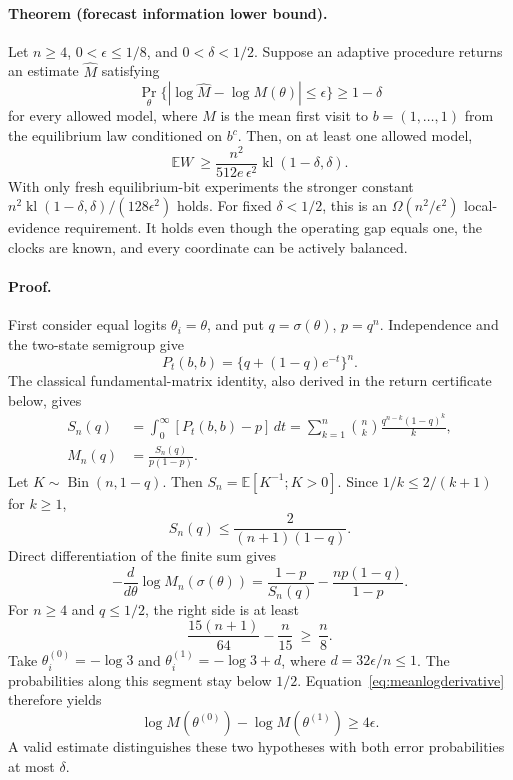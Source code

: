\paragraph{Theorem (forecast information lower bound).}
Let $n\ge4$, $0<\epsilon\le1/8$, and $0<\delta<1/2$.
Suppose an adaptive procedure returns an estimate $\widehat M$ satisfying
\[
 \Pr_\theta\{|\log\widehat M-\log M(\theta)|\le\epsilon\}\ge1-\delta
\]
for every allowed model, where $M$ is the mean first visit to
$b=(1,\ldots,1)$ from the equilibrium law conditioned on $b^c$.
Then, on at least one allowed model,
\begin{equation}
  \mathbb E W\ \ge
  \frac{n^2}{512e\,\epsilon^2}
       \operatorname{kl}(1-\delta,\delta).
  \label{eq:forecastlower}
\end{equation}
With only fresh equilibrium-bit experiments the stronger constant
$n^2\operatorname{kl}(1-\delta,\delta)/(128\epsilon^2)$ holds.
For fixed $\delta<1/2$, this is an $\Omega(n^2/\epsilon^2)$ local-evidence
requirement.  It holds even though the operating gap equals one, the clocks
are known, and every coordinate can be actively balanced.

\paragraph{Proof.}
First consider equal logits $\theta_i=\theta$, and put $q=\sigma(\theta)$,
$p=q^n$.  Independence and the two-state semigroup give
\[
 P_t(b,b)=\{q+(1-q)e^{-t}\}^n.
\]
The classical fundamental-matrix identity, also derived in the return
certificate below, gives
\begin{align}
 S_n(q)&=\int_0^\infty[P_t(b,b)-p]\,dt
       =\sum_{k=1}^n {n\choose k}
                    \frac{q^{n-k}(1-q)^k}{k},\\
 M_n(q)&=\frac{S_n(q)}{p(1-p)}.
 \label{eq:productmeanlower}
\end{align}
Let $K\sim\operatorname{Bin}(n,1-q)$.  Then
$S_n=\mathbb E[K^{-1};K>0]$.  Since
$1/k\le2/(k+1)$ for $k\ge1$,
\[
 S_n(q)\le\frac{2}{(n+1)(1-q)}.
\]
Direct differentiation of the finite sum gives
\begin{equation}
 -\frac{d}{d\theta}\log M_n(\sigma(\theta))
 =\frac{1-p}{S_n(q)}-\frac{np(1-q)}{1-p}.
 \label{eq:meanlogderivative}
\end{equation}
For $n\ge4$ and $q\le1/2$, the right side is at least
\[
 \frac{15(n+1)}{64}-\frac n{15}\ \ge\ \frac n8.
\]
Take $\theta^{(0)}_i=-\log3$ and
$\theta^{(1)}_i=-\log3+d$, where $d=32\epsilon/n\le1$.
The probabilities along this segment stay below $1/2$.
Equation~\eqref{eq:meanlogderivative} therefore yields
\[
 \log M(\theta^{(0)})-\log M(\theta^{(1)})\ge4\epsilon.
\]
A valid estimate distinguishes these two hypotheses with both error
probabilities at most $\delta$.

